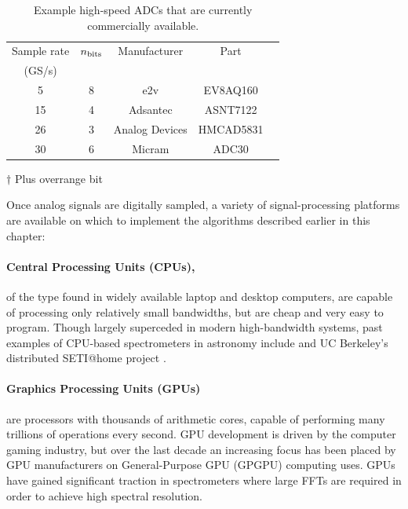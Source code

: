 \documentclass{ws-rv961x669}
\begin{document}
\begin{table}
\begin{center}
\begin{threeparttable}
	\caption{Example high-speed ADCs that are currently commercially available. \label{tab:adcs}}
	\begin{tabular}{c c c c c}
	\hline
	Sample rate  & $n_{\rm{bits}}$ & Manufacturer & Part  \\
	(GS/s)  & & & \\
    \hline
    5 &  8 & e2v & EV8AQ160 \\
	15 &  4 & Adsantec & ASNT7122  \\
	26 &  3\tnote{$\dag$} & Analog Devices & HMCAD5831  \\
	30 &  6 & Micram & ADC30 \\
	\hline
	\end{tabular}
	
  \begin{tablenotes}
  \item[$\dag$] Plus overrange bit
  \end{tablenotes}

\end{threeparttable}
\end{center}
\end{table}

Once analog signals are digitally sampled, a variety of signal-processing platforms are available on which to implement the algorithms described earlier in this chapter:

\paragraph{Central Processing Units (CPUs),} of the type found in widely available laptop and desktop computers, are capable of processing only relatively small bandwidths, but are cheap and very easy to program. Though largely superceded in modern high-bandwidth systems, past examples of CPU-based spectrometers in astronomy include \cite{Montebugnoli1996} and UC Berkeley's distributed SETI@home project \citep{Anderson2002}.


\paragraph{Graphics Processing Units (GPUs)} are processors with thousands of arithmetic cores, capable of performing many trillions of operations every second.
GPU development is driven by the computer gaming industry, but over the last decade an increasing focus has been placed by GPU manufacturers on General-Purpose GPU (GPGPU) computing uses. GPUs have gained significant traction in spectrometers where large FFTs are required in order to achieve high spectral resolution\cite{Kondo2010}.
\end{document}
